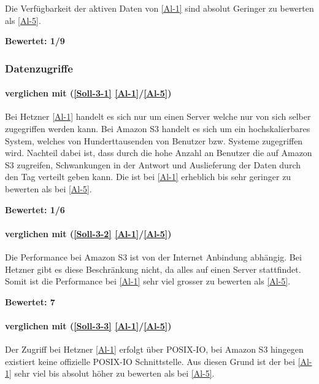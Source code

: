 Die  Verfügbarkeit der aktiven Daten von \ref{Al-1} sind absolut Geringer zu bewerten als \ref{Al-5}.

\textbf{Bewertet: 1/9}

\subsubsection{Datenzugriffe}

\paragraph*{  verglichen mit  (\ref{Soll-3-1} \ref{Al-1}/\ref{Al-5})}
Bei Hetzner \ref{Al-1} handelt es sich nur um einen Server welche nur von sich selber zugegriffen werden kann. Bei Amazon S3 handelt es sich um ein hochskalierbares System, welches von Hunderttausenden von Benutzer bzw. Systeme zugegriffen wird. Nachteil dabei ist, dass durch die hohe Anzahl an Benutzer die auf Amazon S3 zugreifen, Schwankungen in der Antwort und Auslieferung der Daten durch den Tag verteilt geben kann.
Die  ist bei \ref{Al-1} erheblich bis sehr geringer zu bewerten als bei \ref{Al-5}.

\textbf{Bewertet: 1/6}

\paragraph*{  verglichen mit  (\ref{Soll-3-2} \ref{Al-1}/\ref{Al-5})}
Die Performance bei Amazon S3 ist von der Internet Anbindung abhängig. Bei Hetzner gibt es diese Beschränkung nicht, da alles auf einen Server stattfindet. Somit ist die Performance bei  \ref{Al-1} sehr viel grosser zu bewerten als  \ref{Al-5}.

\textbf{Bewertet: 7} 

\paragraph*{  verglichen mit  (\ref{Soll-3-3} \ref{Al-1}/\ref{Al-5})}
Der Zugriff bei Hetzner \ref{Al-1} erfolgt über POSIX-IO, bei Amazon S3 hingegen existiert keine offizielle POSIX-IO Schnittstelle. Aus diesen Grund ist der  bei  \ref{Al-1} sehr viel bis absolut höher zu bewerten als bei  \ref{Al-5}.

